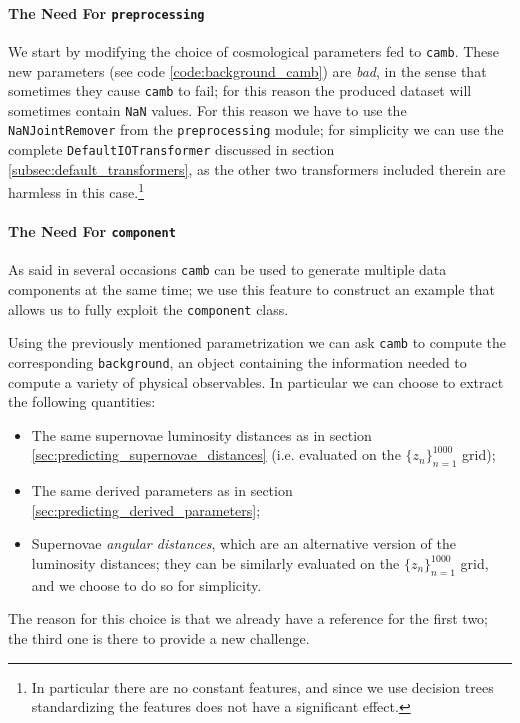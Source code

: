 \paragraph{The Need For \texttt{preprocessing}}
We start by modifying the choice of cosmological parameters fed to \texttt{camb}. These new parameters (see code \ref{code:background_camb}) are \emph{bad}, in the sense that sometimes they cause \texttt{camb} to fail; for this reason the produced dataset will sometimes contain \texttt{NaN} values. For this reason we have to use the \texttt{NaNJointRemover} from the \texttt{preprocessing} module; for simplicity we can use the complete \texttt{DefaultIOTransformer} discussed in section \ref{subsec:default_transformers}, as the other two transformers included therein are harmless in this case.\footnote{In particular there are no constant features, and since we use decision trees standardizing the features does not have a significant effect.}

\paragraph{The Need For \texttt{component}}
As said in several occasions \texttt{camb} can be used to generate multiple data components at the same time; we use this feature to construct an example that allows us to fully exploit the \texttt{component} class.

Using the previously mentioned parametrization we can ask \texttt{camb} to compute the corresponding \texttt{background}, an object containing the information needed to compute a variety of physical observables. In particular we can choose to extract the following quantities:
\begin{itemize}
    \item The same supernovae luminosity distances as in section \ref{sec:predicting_supernovae_distances} (i.e. evaluated on the $\{z_n\}_{n=1}^{1000}$ grid);
    \item The same derived parameters as in section \ref{sec:predicting_derived_parameters};
    \item Supernovae \emph{angular distances}, which are an alternative version of the luminosity distances; they can be similarly evaluated on the $\{z_n\}_{n=1}^{1000}$ grid, and we choose to do so for simplicity.
\end{itemize}
The reason for this choice is that we already have a reference for the first two; the third one is there to provide a new challenge.

